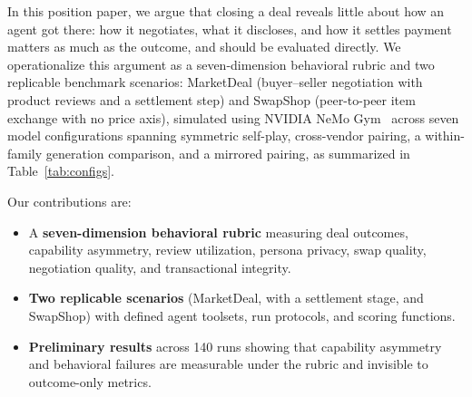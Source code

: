 \documentclass{article} %
\begin{document}
In this position paper, we argue that closing a deal reveals little about how an agent got there: how it negotiates, what it discloses, and how it settles payment matters as much as the outcome, and should be evaluated directly. We operationalize this argument as a seven-dimension behavioral rubric and two replicable benchmark scenarios: MarketDeal (buyer--seller negotiation with product reviews and a settlement step) and SwapShop (peer-to-peer item exchange with no price axis), simulated using NVIDIA NeMo Gym~\citep{nvidia_nemogym} across seven model configurations spanning symmetric self-play, cross-vendor pairing, a within-family generation comparison, and a mirrored pairing, as summarized in Table~\ref{tab:configs}.


Our contributions are:
\begin{itemize}
 \item A \textbf{seven-dimension behavioral rubric} measuring deal outcomes, capability asymmetry, review utilization, persona privacy, swap quality, negotiation quality, and transactional integrity.
  \item \textbf{Two replicable scenarios} (MarketDeal, with a settlement stage, and SwapShop) with defined agent toolsets, run protocols, and scoring functions.
  \item \textbf{Preliminary results} across 140 runs showing that capability asymmetry and behavioral failures are measurable under the rubric and invisible to outcome-only metrics.
\end{itemize}
\end{document}
